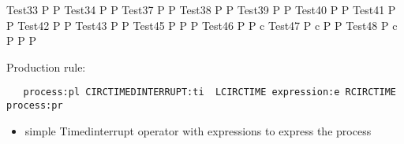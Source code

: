 \documentclass{article}
\begin{document}
\begin{circus}
   \circprocess Test33 \circdef P  \rcirctime P
   \also
   \circprocess Test34 \circdef P  P
   \also
   \circprocess Test37 \circdef P  P
   \also
   \circprocess Test38 \circdef P  P
   \also
   \circprocess Test39 \circdef P  P
   \also
   \circprocess Test40 \circdef P  P
   \also
   \circprocess Test41 \circdef P  P
   \also
   \circprocess Test42 \circdef P  P
   \also
   \circprocess Test43 \circdef P  P
   \also
   \circprocess Test45 \circdef  P \circseq P  P
   \also
   \circprocess Test46 \circdef P   P \circhide   
   \lchanset c \rchanset
   \also
   \circprocess Test47 \circdef  P  \lpar\lchanset c \rchanset\rpar P  P
   \also
   \circprocess Test48 \circdef  P \lpar \lchanset c \rchanset \rpar P  P  P 
\end{circus}



Production rule:
\begin{verbatim}
   process:pl CIRCTIMEDINTERRUPT:ti  LCIRCTIME expression:e RCIRCTIME  process:pr
\end{verbatim}

\begin{itemize}
   \item simple Timedinterrupt operator with expressions to express the process 
\end{itemize}
\end{document}
